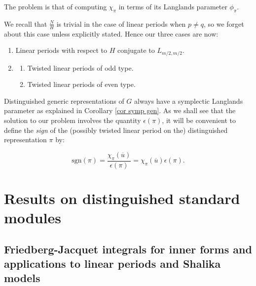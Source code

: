 \documentclass[11pt,letterpaper]{amsart}
\theoremstyle{plain}
\numberwithin{equation}{section}
\newcommand{\sg}{\mathrm{sgn}}
\begin{document}
The problem is that of computing $\chi_\pi$ in terms of its Langlands parameter $\phi_{\pi}$. 

We recall that $\frac{N}{H}$ is trivial in the case of linear periods when $p\neq q$, so we forget about this case unless explicitly stated. Hence our three cases are now:
\begin{enumerate}[1)]
\item Linear periods with respect to $H$ conjugate to $L_{m/2,m/2}$.
\item 
\begin{enumerate} 
\item Twisted linear periods of odd type.
\item Twisted linear periods of even type.
\end{enumerate}
\end{enumerate}

Distinguished generic representations of $G$ always have a symplectic Langlands parameter as explained in Corollary \ref{cor symp gen}. As we shall see that the solution to our problem involves the quantity $\epsilon(\pi)$, it will be convenient to 
define the \textit{sign} of the (possibly twisted linear period on the) distinguished representation $\pi$ by:

\[\sg(\pi)=\frac{\chi_{\pi}(\overline{u})}{\epsilon(\pi)}=\chi_{\pi}(\overline{u}) \epsilon(\pi).\]

\section{Results on distinguished standard modules}\label{sec standard}

\subsection{Friedberg-Jacquet integrals for inner forms and applications to linear periods and Shalika models}\label{sec FJ}
\end{document}

